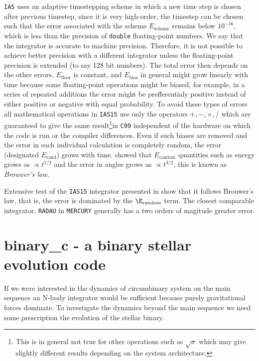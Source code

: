 \texttt{IAS} uses an adaptive timestepping scheme in which a new time
step is chosen after previous timestep, since it is very high-order, the 
timestep can be chosen such that the error associated with the scheme
$E_\text{scheme}$ remains below $10^{-16}$, which is less than the precision
of \texttt{double} floating-point numbers. We say that the integrator is
accurate to machine precision. Therefore, it is not possible to achieve
better precision with a different integrator unless the floating-point 
precision is extended (to say 128 bit numbers). 
The total error then depends on the other errors. $E_\text{floor}$ is constant,
and $E_\text{bias}$ in general might grow linearly with time because
some floating-point operations might be biased, for example, in a series
of repeated additions the error might be prefferentialy positive instead of
either positive or negative with equal probability. To avoid these types of
errors all mathematical operations in \texttt{IAS15} use only the operators
$+,-,\times,/$ which are guaranteed to give the same result\footnote{This is 
in general not true for other operations such as $\sqrt{x}$ which may give 
slightly different results depending on the system architecture.}in \texttt{C99}
independent of the hardware on which the code is run or the compiler differences.
Even if such biases are removed and the error in each individual calculation is
completely random, the error (designated $E_\text{rand}$) grows with time. 
\cite{brouwer} showed that $E_\text{random}$ quantities such as energy
grows as $\propto t^{1/2}$ and the error in angles grows as $\propto t^{3/2}$,
this is known as \emph{Brouwer's law}.

Extensive test of the \texttt{IAS15} integrator presented in \cite{Rein2014} 
show that it follows Brouwer's law, that is, the error is dominated by the 
$\E_\text{random}$ term. The closest comparable integrator, \texttt{RADAU}
in \texttt{MERCURY} generally has a two orders of magitude greater error. 

\section{binary\_c - a binary stellar evolution code}
\label{sec:binary_c - a binary stellar evolution code}
If we were interested in the dynamics of circumbinary system on the main 
sequence an N-body integrator would be sufficient because purely gravitational
forces dominate. To investigate the dynamics beyond the main sequence we 
need some prescription the evolution of the stellar binary. 


